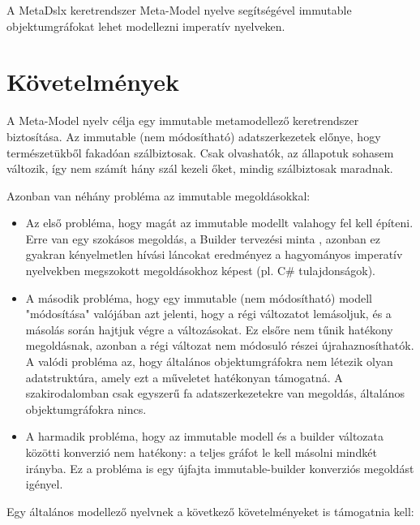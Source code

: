 \documentclass[12pt, a4paper]{report}
\begin{document}
A MetaDslx keretrendszer Meta-Model nyelve segítségével immutable objektumgráfokat lehet modellezni imperatív nyelveken.

\section{Követelmények}

A Meta-Model nyelv célja egy immutable metamodellező keretrendszer biztosítása. Az immutable (nem módosítható) adatszerkezetek előnye, hogy természetükből fakadóan szálbiztosak. Csak olvashatók, az állapotuk sohasem változik, így nem számít hány szál kezeli őket, mindig szálbiztosak maradnak.

Azonban van néhány probléma az immutable megoldásokkal:

\begin{itemize}
	\item Az első probléma, hogy magát az immutable modellt valahogy fel kell építeni. Erre van egy szokásos megoldás, a Builder tervezési minta \cite{Lom19}, azonban ez gyakran kényelmetlen hívási láncokat eredményez a hagyományos imperatív nyelvekben megszokott megoldásokhoz képest (pl. C\# tulajdonságok).
	
	\item A második probléma, hogy egy immutable (nem módosítható) modell "módosítása" valójában azt jelenti, hogy a régi változatot lemásoljuk, és a másolás során hajtjuk végre a változásokat. Ez elsőre nem tűnik hatékony megoldásnak, azonban a régi változat nem módosuló részei újrahaznosíthatók. A valódi probléma az, hogy általános objektumgráfokra nem létezik olyan adatstruktúra, amely ezt a műveletet hatékonyan támogatná. A szakirodalomban csak egyszerű fa adatszerkezetekre van megoldás, általános objektumgráfokra nincs.
	
	\item A harmadik probléma, hogy az immutable modell és a builder változata közötti konverzió nem hatékony: a teljes gráfot le kell másolni mindkét irányba. Ez a probléma is egy újfajta immutable-builder konverziós megoldást igényel.
\end{itemize}

Egy általános modellező nyelvnek a következő követelményeket is támogatnia kell:
\end{document}
